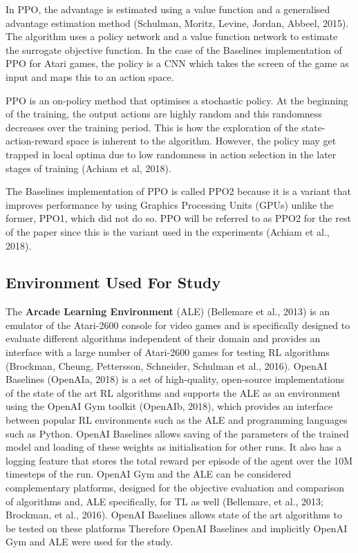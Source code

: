 In PPO, the advantage is estimated using a value function and a generalised advantage estimation method (Schulman, Moritz, Levine, Jordan, Abbeel, 2015). The algorithm uses a policy network and a value function network to estimate the surrogate objective function. In the case of the Baselines implementation of PPO for Atari games, the policy is a CNN which takes the screen of the game as input and maps this to an action space. 

PPO is an on-policy method that optimises a stochastic policy. At the beginning of the training, the output actions are highly random and this randomness decreases over the training period. This is how the exploration of the state-action-reward space is inherent to the algorithm. However, the policy may get trapped in local optima due to low randomness in action selection in the later stages of training (Achiam et al, 2018).

The Baselines implementation of PPO is called PPO2 because it is a variant that improves performance by using Graphics Processing Units (GPUs) unlike the former, PPO1, which did not do so. PPO will be referred to as PPO2 for the rest of the paper since this is the variant used in the experiments (Achiam et al., 2018).

\subsection*{Environment Used For Study}
The \textbf{Arcade Learning Environment} (ALE) (Bellemare et al., 2013) is an emulator of the Atari-2600 console for video games and is specifically designed to evaluate different algorithms independent of their domain and provides an interface with a large number of Atari-2600 games for testing RL algorithms (Brockman, Cheung, Pettersson, Schneider, Schulman et al., 2016). OpenAI Baselines (OpenAIa, 2018) is a set of high-quality, open-source implementations of the state of the art RL algorithms and supports the ALE as an environment using the OpenAI Gym toolkit (OpenAIb, 2018), which provides an interface between popular RL environments such as the ALE and programming languages such as Python. OpenAI Baselines allows saving of the parameters of the trained model and loading of these weights as initialisation for other runs. It also has a logging feature that stores the total reward per episode of the agent over the 10M timesteps of the run. OpenAI Gym and the ALE can be considered complementary platforms, designed for the objective evaluation and comparison of algorithms and, ALE specifically, for TL as well (Bellemare, et al., 2013; Brockman, et al., 2016). OpenAI Baselines allows state of the art algorithms to be tested on these platforms Therefore OpenAI Baselines and implicitly OpenAI Gym and ALE were used for the study.

